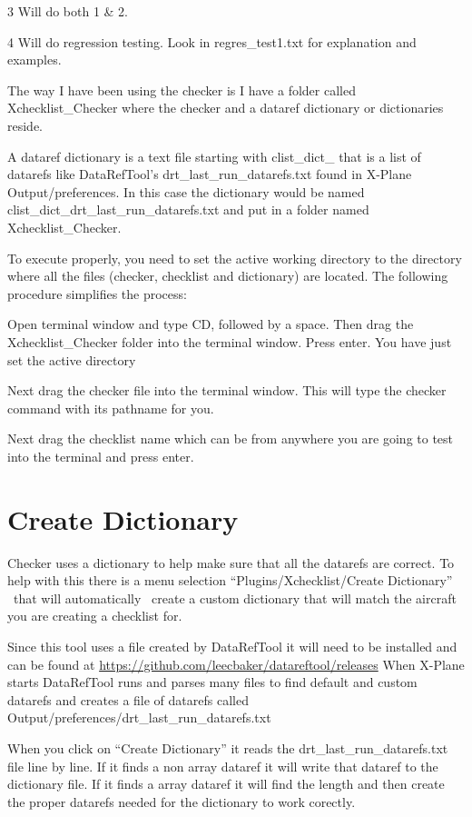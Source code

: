\documentclass[11pt,parskip=half,a4paper]{scrartcl}
\begin{document}
3 Will do both 1 \& 2.

4 Will do regression testing. Look in regres\_test1.txt for explanation and examples.

The way I have been using the checker is I have a folder called Xchecklist\_Checker where the checker and a dataref dictionary or dictionaries reside.

A dataref dictionary is a text file starting with clist\_dict\_ that is a list of datarefs like DataRefTool's
drt\_last\_run\_datarefs.txt found in X-Plane Output/preferences. In this case the dictionary would be named
clist\_dict\_drt\_last\_run\_datarefs.txt and put in a folder named Xchecklist\_Checker.

To execute properly, you need to set the active working directory to the directory where all the files (checker,
checklist and dictionary) are located. The following procedure simplifies the process:

Open terminal window and type CD, followed by a space. Then drag the Xchecklist\_Checker folder into the terminal window. Press enter. You have just set the active directory

Next drag the checker file into the terminal window. This will type the checker command with its pathname for you.

Next drag the checklist name which can be from anywhere you are going to test into the terminal and press enter.

\newpage
\section{Create Dictionary}


Checker uses a dictionary to help make sure that all the datarefs are correct. To help with this there is a menu
selection ``Plugins/Xchecklist/Create Dictionary'' \ that will automatically \ create a custom dictionary that will match the aircraft you are creating a checklist for.

Since this tool uses a file created by DataRefTool it will need to be installed and can be found at
\url{https://github.com/leecbaker/datareftool/releases} When X-Plane starts DataRefTool runs and parses many files to find default and custom datarefs and creates a file of datarefs called
Output/preferences/drt\_last\_run\_datarefs.txt

When you click on ``Create Dictionary'' it reads the drt\_last\_run\_datarefs.txt file line by line. If it finds a non array dataref it will write that dataref to the dictionary file. If it finds a array dataref it will find the length and then create the proper datarefs needed for the dictionary to work corectly. 
\end{document}
